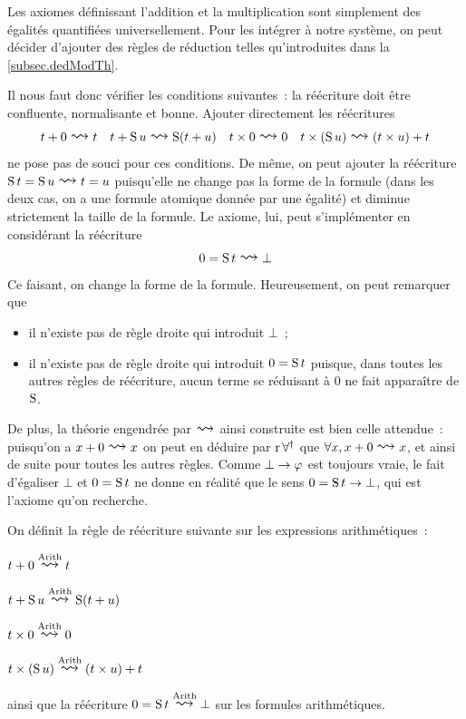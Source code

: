 Les axiomes définissant l'addition et la multiplication sont simplement des
égalités quantifiées universellement. Pour les intégrer à notre système, on
peut décider d'ajouter des règles de réduction telles qu'introduites dans la
\cref{subsec.dedModTh}.

Il nous faut donc vérifier les conditions suivantes~: la réécriture doit être
confluente, normalisante et bonne. Ajouter directement les réécritures
\[t + 0 \reecr{} t \quad t + \Ss u \reecr{} \Ss (t + u) \quad
t \times 0 \reecr{} 0 \quad t \times (\Ss u) \reecr{} (t \times u) + t\]
ne pose pas de souci pour ces conditions. De même, on peut ajouter la
réécriture $\Ss t = \Ss u \reecr{} t = u$ puisqu'elle ne change pas la forme
de la formule (dans les deux cas, on a une formule atomique donnée par une
égalité) et diminue strictement la taille de la formule. Le
 axiome, lui, peut s'implémenter en considérant la
réécriture
\[0 = \Ss t \reecr{} \bot\]
Ce faisant, on change la forme de la formule. Heureusement, on peut remarquer
que
\begin{itemize}
\item il n'existe pas de règle droite qui introduit $\bot$~;
\item il n'existe pas de règle droite qui introduit $0 = \operatorname{S} t$ puisque,
  dans toutes les autres règles de réécriture, aucun terme se réduisant
  à $0$ ne fait apparaître de $\operatorname{S}$.
\end{itemize}

De plus, la théorie engendrée par $\reecr{}$ ainsi construite est bien
celle attendue~: puisqu'on a $x + 0 \reecr{} x$ on peut en déduire par
$\operatorname{r}\mathord{\forall}^\dagger$ que $\forall x, x + 0 \reecr{} x$, et ainsi de suite
pour toutes les autres règles. Comme $\bot\to \varphi$ est toujours vraie,
le fait d'égaliser $\bot$ et $0 = \operatorname{S} t$ ne donne en réalité que le sens
$0 = \operatorname{S} t \to \bot$, qui est l'axiome qu'on recherche.

\begin{definition}
  On définit la règle de réécriture suivante sur les expressions
  arithmétiques~:
  \begin{itemize}
    \begin{minipage}{0.45\textwidth}
    \item $t + 0 \reecr{\Arith} t$
    \item $t + \Ss u \reecr{\Arith} \Ss (t + u)$
    \end{minipage}
    \begin{minipage}{0.45\textwidth}
    \item $t \times 0 \reecr{\Arith} 0$
    \item $t \times (\Ss u) \reecr{\Arith} (t\times u) + t$
    \end{minipage}
  \end{itemize}
  ainsi que la réécriture $0 = \Ss t \reecr{\Arith} \bot$ sur les formules
  arithmétiques.
  \index[notation]{$\reecr{\Arith}$}
\end{definition}

